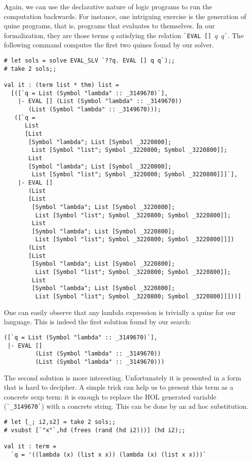 Again, we can use the declarative nature of logic programs to run the
computation backwards.  For instance, one intriguing exercise is the
generation of quine programs, that is, programs that evaluates to
themselves.  In our formalization, they are those terms $q$ satisfying
the relation \verb|`EVAL|~\verb|[]|~$q$~$q$\verb|`|.  The following command
computes the first two quines found by our solver.
\begin{verbatim}
# let sols = solve EVAL_SLV `??q. EVAL [] q q`);;
# take 2 sols;;

val it : (term list * thm) list =
  [([`q = List (Symbol "lambda" :: _3149670)`],
    |- EVAL [] (List (Symbol "lambda" :: _3149670))
       (List (Symbol "lambda" :: _3149670)));
   ([`q =
      List
      [List
       [Symbol "lambda"; List [Symbol _3220800];
        List [Symbol "list"; Symbol _3220800; Symbol _3220800]];
       List
       [Symbol "lambda"; List [Symbol _3220800];
        List [Symbol "list"; Symbol _3220800; Symbol _3220800]]]`],
    |- EVAL []
       (List
       [List
        [Symbol "lambda"; List [Symbol _3220800];
         List [Symbol "list"; Symbol _3220800; Symbol _3220800]];
        List
        [Symbol "lambda"; List [Symbol _3220800];
         List [Symbol "list"; Symbol _3220800; Symbol _3220800]]])
       (List
       [List
        [Symbol "lambda"; List [Symbol _3220800];
         List [Symbol "list"; Symbol _3220800; Symbol _3220800]];
        List
        [Symbol "lambda"; List [Symbol _3220800];
         List [Symbol "list"; Symbol _3220800; Symbol _3220800]]]))]
\end{verbatim}

One can easily observe that any lambda expression is trivially a quine
for our language.  This is indeed the first solution found by our
search:
\begin{verbatim}
([`q = List (Symbol "lambda" :: _3149670)`],
 |- EVAL []
         (List (Symbol "lambda" :: _3149670))
         (List (Symbol "lambda" :: _3149670)))
\end{verbatim}

The second solution is more interesting.  Unfortunately it is
presented in a form that is hard to decipher.  A simple trick can help
us to present this term as a concrete sexp term: it is enough to
replace the HOL generated variable (\verb|`_3149670`|) with a concrete
string.  This can be done by an ad hoc substitution.
\begin{verbatim}
# let [_; i2,s2] = take 2 sols;;
# vsubst [`"x"`,hd (frees (rand (hd i2)))] (hd i2);;

val it : term =
  `q = '((lambda (x) (list x x)) (lambda (x) (list x x)))`
\end{verbatim}

